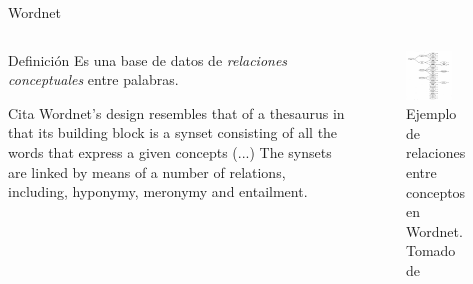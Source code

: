 \documentclass[presentation]{beamer}
\begin{document}
\begin{frame}[label={sec:orgd985e9e}]{Wordnet}
\begin{columns}
\begin{column}{0.48\columnwidth}
    \begin{block}{Definición}
Es una base de datos de \emph{relaciones conceptuales} entre palabras.
\end{block}


\begin{block}{Cita}
Wordnet's design resembles that of a thesaurus in that its building block is a synset consisting of all the
words that express a given concepts (...) The synsets are linked by means of a number of relations,
including, hyponymy, meronymy and entailment.     \cite[p.8]{fellbaum_1998}
\end{block}
\end{column}


\begin{column}{0.48\columnwidth}
\begin{figure}
\includegraphics[width=0.7\textwidth]{./assets/wordnet-relaciones.png}
\caption{Ejemplo de relaciones entre conceptos en Wordnet. Tomado de \cite[p.30]{fellbaum_1998}}
\end{figure}
\end{column}
\end{columns}
\end{frame}
\end{document}
